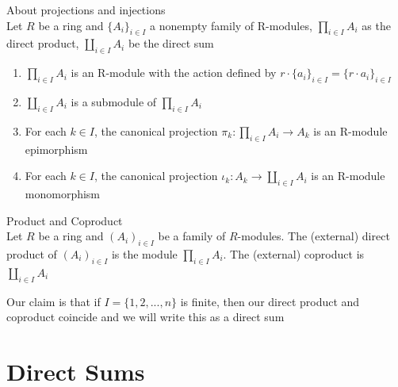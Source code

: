 \documentclass{report}
\begin{document}
\begin{thm}{About projections and injections}{} \\
Let $R$ be a ring and $\{A_i\}_{i\in I}$ a nonempty family of R-modules, $\prod _{i \in I}A_i$ as the direct product, $\coprod _{i\in I}A_i$ be the direct sum
\begin{enumerate}
    \item $\prod _{i \in I}A_i$ is an R-module with the action defined by $r\cdot \{a_i\}_{i \in I} = \{r\cdot a_i\}_{i\in I}$
    \item $\coprod _{i \in I}A_i$ is a submodule of $\prod _{i \in I}A_i$
    \item For each $k \in I$, the canonical projection $\pi _k:\prod _{i\in I}A_i \to A_k$ is an R-module epimorphism
    \item For each $k \in I$, the canonical projection $\iota _k: A_k \to \coprod _{i \in I} A_i$ is an R-module monomorphism
\end{enumerate}
    
\end{thm}

\begin{definition}{Product and Coproduct}{}\\
    Let $R$ be a ring and $(A_i)_{i \in I}$ be a family of $R$-modules. The (external) direct product of $(A_i)_{i\in I}$ is the module $\prod \limits _{i\in I}A_i$. The (external) coproduct is $\coprod \limits _{i \in I}A_i$
\end{definition}

Our claim is that if $I = \{1,2,...,n\}$ is finite, then our direct product and coproduct coincide and we will write this as a direct sum
\section{Direct Sums}

\end{document}
